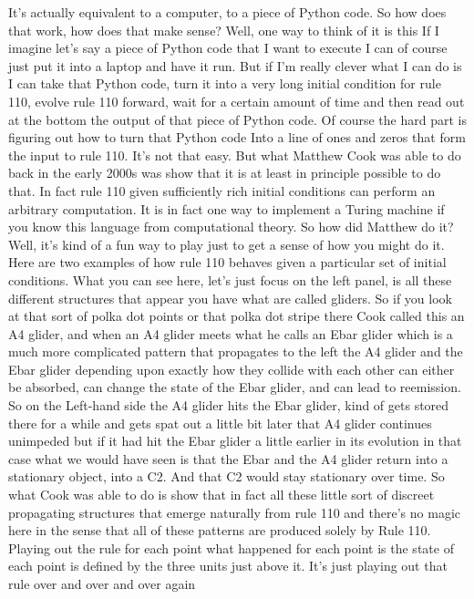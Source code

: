 \documentclass[]{article}
\begin{document}
It's actually equivalent to a computer,
to a piece of Python code.
So how does that work, how does that make sense?
Well, one way to think of it is this
If I imagine let's say a piece of Python
code that I want to execute
I can of course just put it into
a laptop and have it run.
But if I'm really clever
what I can do is I can take
that Python code,
turn it into a very long
initial condition for rule 110,
evolve rule 110 forward,
wait for a certain amount of time
and then read out at the bottom
the output of that piece of Python code.
Of course the hard part is figuring out
how to turn that Python code
Into a line of ones and zeros
that form the input to rule 110.
It's not that easy.
But what Matthew Cook was able to do
back in the early 2000s
was show that it is at least
in principle possible to do that.
In fact rule 110 given
sufficiently rich initial conditions
can perform an arbitrary computation.
It is in fact one way to implement
a Turing machine
if you know this language from computational theory.
So how did Matthew do it?
Well, it's kind of a fun way to play
just to get a sense of how you might do it.
Here are two examples
of how rule 110 behaves
given a particular set of initial conditions.
What you can see here,
let's just focus on the left panel,
is all these different structures
that appear
you have what are called gliders.
So if you look at that sort of polka dot points
or that polka dot stripe there
Cook called this an A4 glider,
and when an A4 glider meets
what he calls an Ebar glider
which is a much more complicated pattern
that propagates to the left
the A4 glider and the Ebar glider
depending upon exactly
how they collide with each other
can either be absorbed,
can change the state of the Ebar glider,
and can lead to reemission.
So on the Left-hand side the
A4 glider hits the Ebar glider,
kind of gets stored there for a while
and gets spat out a little bit later
that A4 glider continues unimpeded
but if it had hit the
Ebar glider a little earlier
in its evolution
in that case what we would have seen
is that the Ebar and the A4 glider
return into a stationary object,
into a C2.
And that C2 would stay
stationary over time.
So what Cook was able
to do is show
that in fact all these little sort of
discreet propagating structures
that emerge naturally from rule 110
and there's no magic here in the sense
that all of these patterns are produced
solely by Rule 110.
Playing out the rule for each point
what happened for each point
is the state of each point is defined
by the three units just above it.
It's just playing out that rule
over and over and over again
\end{document}
